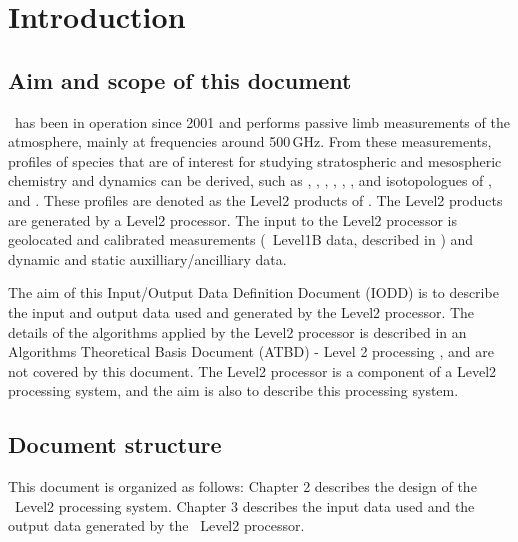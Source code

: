 \chapter{Introduction}
\label{chapter:introduction}


\setcounter{page}{1}


\section{Aim and scope of this document}
\label{sec:aim}

\smr\ has been in operation since 2001 and performs passive
limb measurements of the atmosphere, mainly at frequencies around 500\,GHz.
From these measurements, profiles of species that are of interest for studying
stratospheric and mesospheric chemistry and dynamics can be derived, such as
, , , , ,
, and isotopologues of , and . These profiles
are denoted as the Level2 products of \smr. The Level2 products are generated
by a Level2 processor. The input to the Level2 processor is geolocated and
calibrated measurements (\smr\ Level1B data, described in \citet{atbdl1b}) and
dynamic and static auxilliary/ancilliary data.

The aim of this Input/Output Data Definition Document (IODD) is to describe
the input and output data used and generated by the Level2 processor.
The details of the algorithms applied by the Level2 processor
is described in an Algorithms Theoretical Basis Document (ATBD) - 
Level 2 processing \citep{atbdl2}, and are not covered by this document.
The Level2 processor is a component of a Level2 processing system,
and the aim is also to describe this processing system.

\section{Document structure}

This document is organized as follows:
Chapter 2 describes the design of the \smr\ Level2 processing system. 
Chapter 3 describes the input data used and the output data generated 
by the \smr\ Level2 processor.


